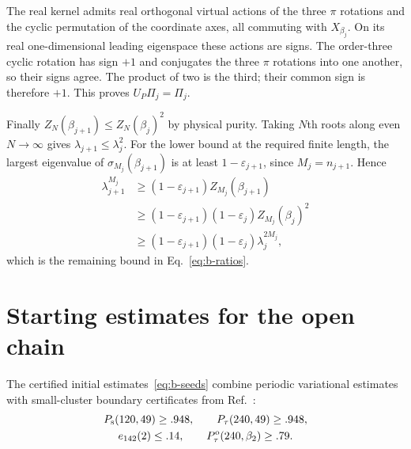 \documentclass[aps,prl,reprint,amsmath,amssymb,nofootinbib,raggedbottom]{revtex4-2}
\begin{document}
The real kernel admits real orthogonal virtual actions of the three
$\pi$ rotations and the cyclic permutation of the coordinate axes,
all commuting with $X_{\beta_j}$. On its real one-dimensional leading
eigenspace these actions are signs. The order-three cyclic rotation
has sign $+1$ and conjugates the three $\pi$ rotations into one another,
so their signs agree. The product of two is the third; their common
sign is therefore $+1$. This proves $U_P\Pi_j=\Pi_j$.

Finally $Z_N(\beta_{j+1})\le Z_N(\beta_j)^2$ by physical purity.
Taking $N$th roots along even $N\to\infty$ gives
$\lambda_{j+1}\le\lambda_j^2$. For the lower bound at the required
finite length, the largest eigenvalue of $\sigma_{M_j}(\beta_{j+1})$
is at least $1-\varepsilon_{j+1}$, since $M_j=n_{j+1}$. Hence
\begin{align*}
 \lambda_{j+1}^{M_j}
 &\ge(1-\varepsilon_{j+1})Z_{M_j}(\beta_{j+1})\\
 &\ge(1-\varepsilon_{j+1})(1-\varepsilon_j)Z_{M_j}(\beta_j)^2\\
 &\ge(1-\varepsilon_{j+1})(1-\varepsilon_j)\lambda_j^{2M_j},
\end{align*}
which is the remaining bound in Eq.~\eqref{eq:b-ratios}.


\section{Starting estimates for the open chain}\label{app:b-iteration}
The certified initial estimates~\eqref{eq:b-seeds} combine periodic variational estimates with small-cluster boundary certificates from Ref.~\cite{boundary}:
\begin{equation}
 \begin{gathered}
 P_{\mathrm s}(120,49)\ge .948,\qquad P_{\tau}(240,49)\ge .948,\\
 e_{142}(2)\le .14,\qquad P_{\tau}^{\mathrm{o}}(240,\beta_{2})\ge .79.
 \end{gathered}
 \label{eq:b-seeds}
\end{equation}
\end{document}
